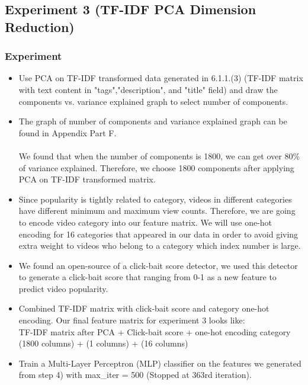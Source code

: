\documentclass[english]{article}
\begin{document}
\subsection{Experiment 3 (TF-IDF PCA Dimension Reduction)}
\subsubsection{Experiment}
\begin{itemize}
\item Use PCA on TF-IDF transformed data generated in 6.1.1.(3) (TF-IDF matrix with text content in "tags","description", and "title" field) and draw the components vs. variance explained graph to select number of components.
\item The graph of number of components and variance explained graph can be found in Appendix Part F. \\\\
We found that when the number of components is 1800, we can get over 80\% of variance explained. Therefore, we choose 1800 components after applying PCA on TF-IDF transformed matrix.
\item Since popularity is tightly related to category, videos in different categories have different minimum and maximum view counts. Therefore, we are going to encode video category into our feature matrix. We will use one-hot encoding for 16 categories that appeared in our data in order to avoid giving extra weight to videos who belong to a category which index number is large.
\item We found an open-source of a click-bait score detector\cite{click-bait}, we used this detector to generate a click-bait score that ranging from 0-1 as a new feature to predict video popularity.
\item Combined TF-IDF matrix with click-bait score and category one-hot encoding. Our final feature matrix for experiment 3 looks like: \\
    TF-IDF matrix after PCA  + Click-bait score  + one-hot encoding category\\
    (1800 columns) + (1 columns)  +  (16 columns)
\item Train a Multi-Layer Perceptron (MLP) classifier on the features we generated from step 4) with max\_iter = 500 (Stopped at 363rd iteration).
\end{itemize}
\end{document}
